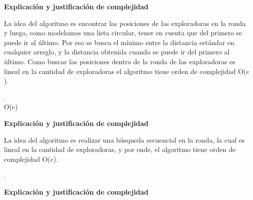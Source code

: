 \documentclass[11pt]{article}
\begin{document}
\begin{center}
\textbf{Explicación y justificación de complejidad} \\ 
\end{center} 

La idea del algoritmo es encontrar las posiciones de las exploradoras en la ronda y luego, como modelamos 
una lista circular, tener en cuenta que del primero se puede ir al último. Por eso se busca el mínimo entre
la distancia estándar en cualquier arreglo, y la distancia obtenida cuando se puede ir del primero al último.
Como buscar las posiciones dentro de la ronda de las exploradoras es lineal en la cantidad de exploradoras 
el algoritmo tiene orden de complejidad O($e$).

\noindent\makebox[\linewidth]{\rule{17cm}{0.4pt}}
.\\
 {O($e$)}

\vspace{3mm}
\begin{center}
\textbf{Explicación y justificación de complejidad} \\ 
\end{center} 

La idea del algoritmo es realizar una búsqueda secuencial en la ronda, la cual es lineal en la cantidad de 
exploradoras, y por ende, el algoritmo tiene orden de complejidad O($e$).

\noindent\makebox[\linewidth]{\rule{17cm}{0.4pt}}
.\\

\vspace{3mm}
\begin{center}
\textbf{Explicación y justificación de complejidad} \\ 
\end{center} 
\end{document}
